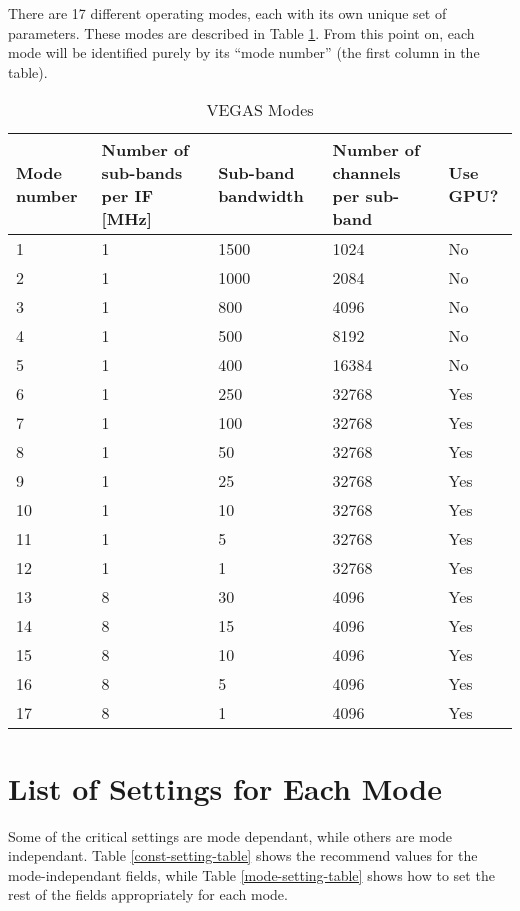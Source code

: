 \documentclass[11pt]{article} %
\begin{document}
There are 17 different operating modes, each with its own unique set of parameters. These modes are described in Table \ref{mode-table}. From this point on, each mode will be identified purely by its ``mode number'' (the first column in the table).


\begin{table}[!h]
\centering
\caption{VEGAS Modes}
\begin{tabular}{| p{1.6cm}|  p{4cm} | p{2.4cm} | p{3.5cm} | p{1.6cm} |}
\hline
\bf Mode number & \bf Number of sub-bands per IF [MHz] & \bf Sub-band bandwidth & \bf Number of channels per sub-band & \bf Use GPU? \\
\hline
1 & 1 & 1500 & 1024 & No \\
2 & 1 & 1000 & 2084 & No \\
3 & 1 & 800 & 4096 & No \\
4 & 1 & 500 & 8192 & No \\
5 & 1 & 400 & 16384 & No \\
6 & 1 & 250 & 32768 & Yes \\
7 & 1 & 100 & 32768 & Yes \\
8 & 1 & 50 & 32768 & Yes \\
9 & 1 & 25 & 32768 & Yes \\
10 & 1 & 10 & 32768 & Yes \\
11 & 1 & 5 & 32768 & Yes \\
12 & 1 & 1 & 32768 & Yes \\
13 & 8 & 30 & 4096 & Yes \\
14 & 8 & 15 & 4096 & Yes \\
15 & 8 & 10 & 4096 & Yes \\
16 & 8 & 5 & 4096 & Yes \\
17 & 8 & 1 & 4096 & Yes \\
\hline
\end{tabular}
\label{mode-table}
\end{table}

\section{List of Settings for Each Mode}

Some of the critical settings are mode dependant, while others are mode independant. Table \ref{const-setting-table} shows the recommend values for the mode-independant fields, while Table \ref{mode-setting-table} shows how to set the rest of the fields appropriately for each mode.
\end{document}
